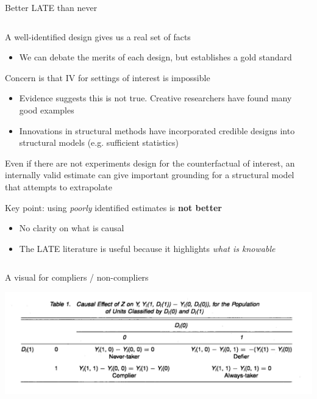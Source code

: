 \documentclass[notes,11pt, aspectratio=169]{beamer}
\newenvironment{wideitemize}{\itemize\addtolength{\itemsep}{10pt}}{\enditemize}
\begin{document}
\begin{frame}{Better LATE than never}
  \begin{columns}[T] %
    \begin{column}{0.9\textwidth}
      \begin{wideitemize}
      \item A well-identified design gives us a real set of facts
        \begin{itemize}
        \item We can debate the merits of each design, but
          establishes a gold standard
        \end{itemize}
      \item Concern is that IV for settings of interest is impossible
        \begin{itemize}
        \item Evidence suggests this is not true. Creative researchers
          have found many good examples
        \item Innovations in structural methods have incorporated
          credible designs into structural models (e.g. sufficient statistics)
        \end{itemize}
      \item Even if there are not experiments design for the
        counterfactual of interest, an internally valid estimate can
        give important grounding for a structural model that attempts
        to extrapolate
      \item Key point: using \emph{poorly} identified estimates is \textbf{not better}
        \begin{itemize}
        \item No clarity on what is causal
        \item The LATE literature is useful because it highlights \emph{what is knowable}
        \end{itemize}
      \end{wideitemize}
\end{column}
\begin{column}{0.5\textwidth}
\end{column}
\end{columns}
\end{frame}

\begin{frame}{A visual for compliers / non-compliers}
  \begin{center}
    \includegraphics[width=\linewidth]{images/complier_table.png}
  \end{center}
\end{frame}
\end{document}

